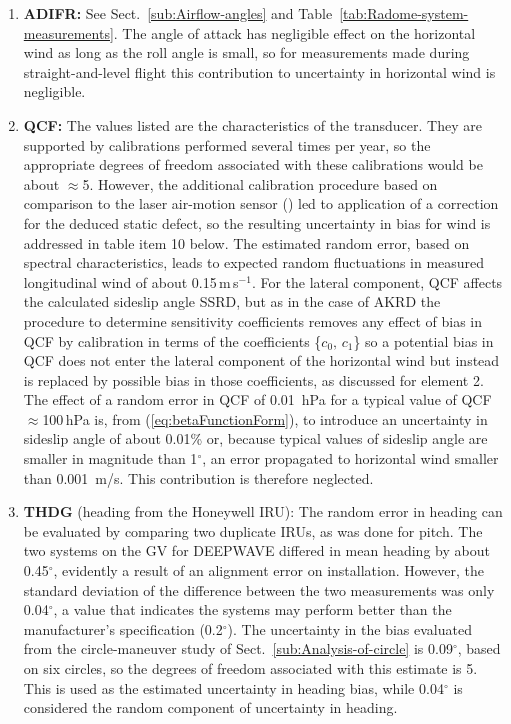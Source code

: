 \documentclass[12pt,twoside,english]{article}\usepackage[]{graphicx}\usepackage[]{color}
\let\OrgIndex\index
\renewcommand*{\index}[1]{\OrgIndex{#1}}
\begin{document}
{{\begin{enumerate}
\item \textbf{ADIFR: }
See Sect.~\ref{sub:Airflow-angles} and Table~\ref{tab:Radome-system-measurements}. The angle of attack has negligible effect on the horizontal wind as long as the roll angle is small, so for measurements made during straight-and-level flight this contribution to uncertainty in horizontal wind is negligible.  
\item \textbf{QCF:} 
The values listed are the characteristics of the transducer. They are supported by calibrations performed several times per year, so the appropriate degrees of freedom associated with these calibrations would be about $\approx$5. However, the additional calibration procedure based on comparison to the laser air-motion sensor (\citet{CooperEtAl2014}) led to application of a correction for the deduced static defect, so the resulting uncertainty in bias for wind is addressed in table item 10 below. The estimated random error, based on spectral characteristics, leads to expected random fluctuations in measured longitudinal wind of about 0.15\,m\,s$^{-1}$.
For the lateral component, QCF affects the calculated sideslip angle SSRD, but as in the case of AKRD the procedure to determine sensitivity coefficients removes any effect of bias in QCF by calibration in terms of the coefficients \{$c_{0},\,c_{1}$\} so a potential bias in QCF does not enter the lateral component of the horizontal wind but instead is replaced by possible bias in those coefficients, as discussed for element 2. The effect of a random error in QCF of 0.01~hPa for a typical value of QCF$\approx$100\,hPa is, from (\ref{eq:betaFunctionForm}), to introduce an uncertainty in sideslip angle of about 0.01\% or, because typical values of sideslip angle are smaller in magnitude than 1$^{\circ}$, an error propagated to horizontal wind smaller than 0.001~m/s. This contribution is therefore neglected.  
\item \textbf{THDG} (heading from the Honeywell IRU):
The random error in heading can be evaluated by comparing two duplicate IRUs, as was done for pitch. The two systems on the GV for DEEPWAVE differed in mean heading by about 0.45$^{\circ}$, evidently a result of an alignment error on installation. However, the standard deviation of the difference between the two measurements was only 0.04$^{\circ}$, a value that indicates the systems may perform better than the manufacturer's specification (0.2$^{\circ}$). The uncertainty in the bias evaluated from the circle-maneuver study of Sect.~\ref{sub:Analysis-of-circle} is 0.09$^{\circ}$, based on six circles, so the degrees of freedom associated with this estimate is 5. This is used as the estimated uncertainty in heading bias, while 0.04$^{\circ}$ is considered the random component of uncertainty in heading.  

\end{enumerate}}}
\end{document}
